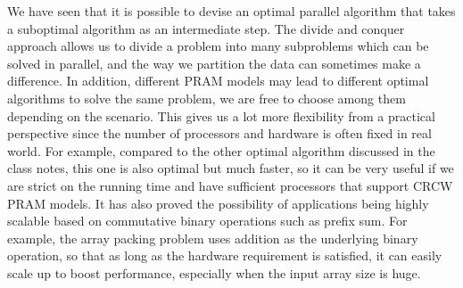 \documentclass[11pt]{article}
\begin{document}
\begin{enumerate}
    We have seen that it is possible to devise an optimal parallel algorithm that takes a suboptimal algorithm as an intermediate step. The divide and conquer approach allows us to divide a problem into many subproblems which can be solved in parallel, and the way we partition the data can sometimes make a difference. In addition, different PRAM models may lead to different optimal algorithms to solve the same problem, we are free to choose among them depending on the scenario. This gives us a lot more flexibility from a practical perspective since the number of processors and hardware is often fixed in real world. For example, compared to the other optimal algorithm discussed in the class notes, this one is also optimal but much faster, so it can be very useful if we are strict on the running time and have sufficient processors that support CRCW PRAM models. It has also proved the possibility of applications being highly scalable based on commutative binary operations such as prefix sum. For example, the array packing problem uses addition as the underlying binary operation, so that as long as the hardware requirement is satisfied, it can easily scale up to boost performance, especially when the input array size is huge.

  \end{enumerate}
\end{document}
